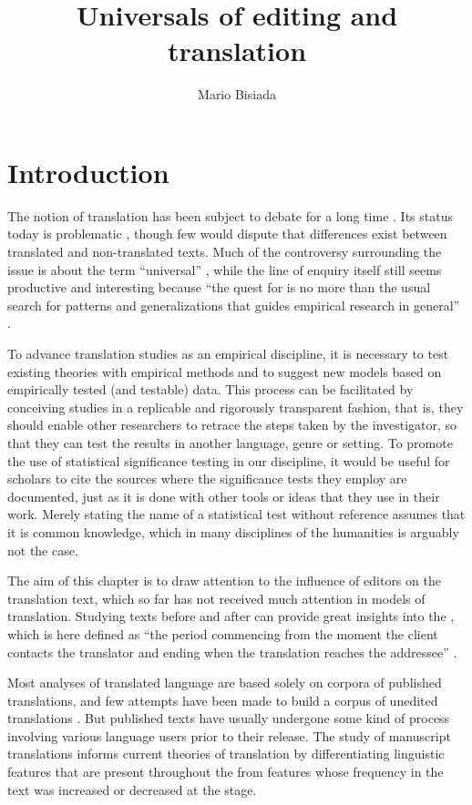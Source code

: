 \documentclass[output=paper]{LSP/langsci}
\author{Mario Bisiada\affiliation{Universitat Pompeu Fabra}}
\title{Universals of editing and translation}
\begin{document}
\section{Introduction}

The notion of translation  has been subject to debate for a long time \parencites{baker93}{chesterman04}{mauranen04}. Its status today is problematic \parencite[see][]{house08}, though few would dispute that differences exist between translated and non-translated texts. Much of the controversy surrounding the issue is about the term \enquote{universal} \parencite[86]{chesterman14}, while the line of enquiry itself still seems productive and interesting because ``the quest for  is no more than the usual search for patterns and generalizations that guides empirical research in general'' \citep[87]{chesterman14}.

To advance translation studies as an empirical discipline, it is necessary to test existing theories with empirical methods and to suggest new models based on empirically tested (and testable) data. This process can be facilitated by conceiving studies in a replicable and rigorously transparent fashion, that is, they should enable other researchers to retrace the steps taken by the investigator, so that they can test the results in another language, genre or setting. To promote the use of statistical significance testing in our discipline, it would be useful for scholars to cite the sources where the significance tests they employ are documented, just as it is done with other tools or ideas that they use in their work. Merely stating the name of a statistical test without reference assumes that it is common knowledge, which in many disciplines of the humanities is arguably not the case.

The aim of this chapter is to draw attention to the influence of editors on the translation text, which so far has not received much attention in models of translation. Studying texts before and after  can provide great insights into the , which is here defined as ``the period commencing from the moment the client contacts the translator and ending when the translation reaches the addressee'' \citep[179]{munoz10}.

Most analyses of translated language are based solely on corpora of published translations, and few attempts have been made to build a corpus of unedited translations \parencite[for an early such design, see][]{utka04}. But published texts have usually undergone some kind of  process involving various language users prior to their release. The study of manuscript translations informs current theories of translation by differentiating linguistic features that are present throughout the  from features whose frequency in the text was increased or decreased at the  stage.
\end{document}
